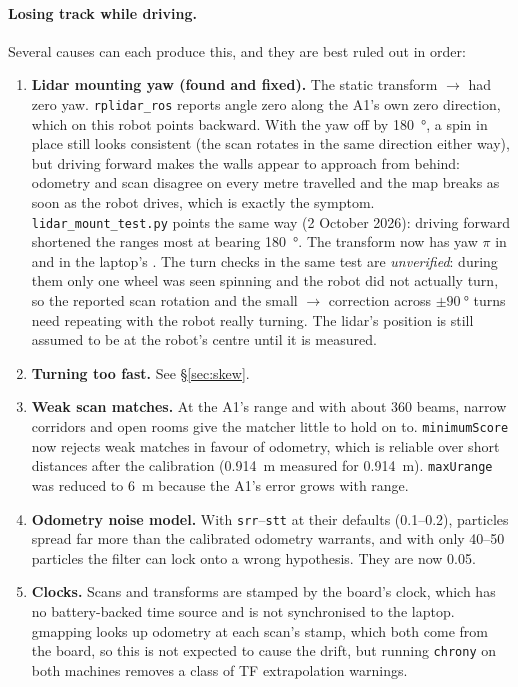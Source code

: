 \paragraph{Losing track while driving.} Several causes can each produce this,
and they are best ruled out in order:
\begin{enumerate}
\item \textbf{Lidar mounting yaw (found and fixed).} The static transform
  $\to$ had zero yaw. \texttt{rplidar\_ros}
  reports angle zero along the A1's own zero direction, which on this robot
  points backward. With the yaw off by \SI{180}{\degree}, a spin in place
  still looks consistent (the scan rotates in the same direction either
  way), but driving forward makes the walls appear to approach from behind:
  odometry and scan disagree on every metre travelled and the map breaks as
  soon as the robot drives, which is exactly the symptom.
  \texttt{lidar\_mount\_test.py} points the same way (2 October 2026):
  driving forward shortened the ranges most at bearing \SI{180}{\degree}.
  The transform now has yaw $\pi$ in  and in the laptop's
  . The turn checks in the same test are
  \emph{unverified}: during them only one wheel was seen spinning and the
  robot did not actually turn, so the reported scan rotation and the small
  $\to$ correction across $\pm\SI{90}{\degree}$ turns
  need repeating with the robot really turning. The lidar's position
  is still assumed to be at the robot's centre until it is measured.
\item \textbf{Turning too fast.} See \S\ref{sec:skew}.
\item \textbf{Weak scan matches.} At the A1's range and with about 360 beams,
  narrow corridors and open rooms give the matcher little to hold on to.
  \texttt{minimumScore} now rejects weak matches in favour of odometry, which
  is reliable over short distances after the calibration
  (\SI{0.914}{m} measured for \SI{0.914}{m}). \texttt{maxUrange} was reduced to
  \SI{6}{m} because the A1's error grows with range.
\item \textbf{Odometry noise model.} With \texttt{srr}--\texttt{stt} at their
  defaults (0.1--0.2), particles spread far more than the calibrated odometry
  warrants, and with only 40--50 particles the filter can lock onto a wrong
  hypothesis. They are now 0.05.
\item \textbf{Clocks.} Scans and transforms are stamped by the board's clock,
  which has no battery-backed time source and is not synchronised to the
  laptop. gmapping looks up odometry at each scan's stamp, which both come
  from the board, so this is not expected to cause the drift, but running
  \texttt{chrony} on both machines removes a class of TF extrapolation
  warnings.
\end{enumerate}

